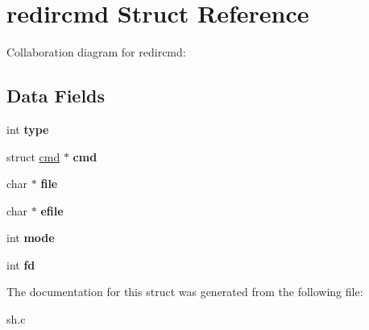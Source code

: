 \hypertarget{structredircmd}{}\section{redircmd Struct Reference}
\label{structredircmd}


Collaboration diagram for redircmd\+:
\subsection*{Data Fields}
\begin{DoxyCompactItemize}
\item 
int {\bfseries type}\hypertarget{structredircmd_ac3e4a2de55ca2175ede05a3f49bbb835}{}\label{structredircmd_ac3e4a2de55ca2175ede05a3f49bbb835}

\item 
struct \hyperlink{structcmd}{cmd} $\ast$ {\bfseries cmd}\hypertarget{structredircmd_ad0e2824b83cc8a1da99b2922025011dc}{}\label{structredircmd_ad0e2824b83cc8a1da99b2922025011dc}

\item 
char $\ast$ {\bfseries file}\hypertarget{structredircmd_adfbfcf9111724e5b453bab2ed3ee308f}{}\label{structredircmd_adfbfcf9111724e5b453bab2ed3ee308f}

\item 
char $\ast$ {\bfseries efile}\hypertarget{structredircmd_a7bd00698c6fbc539415332f187d78317}{}\label{structredircmd_a7bd00698c6fbc539415332f187d78317}

\item 
int {\bfseries mode}\hypertarget{structredircmd_a36b522983b6a0c0efdaea471b08d120b}{}\label{structredircmd_a36b522983b6a0c0efdaea471b08d120b}

\item 
int {\bfseries fd}\hypertarget{structredircmd_a1d4b8ba36b5bb4e9e4af58a6d58934a1}{}\label{structredircmd_a1d4b8ba36b5bb4e9e4af58a6d58934a1}

\end{DoxyCompactItemize}


The documentation for this struct was generated from the following file\+:\begin{DoxyCompactItemize}
\item 
sh.\+c\end{DoxyCompactItemize}
